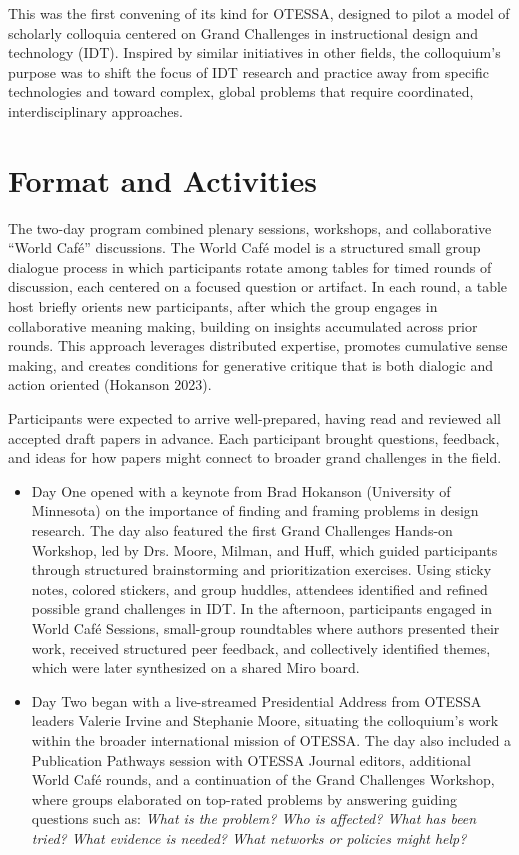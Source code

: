 \documentclass[
  letterpaper,
  DIV=11,
  numbers=noendperiod]{scrartcl}
\begin{document}
This was the first convening of its kind for OTESSA, designed to pilot a
model of scholarly colloquia centered on Grand Challenges in
instructional design and technology (IDT). Inspired by similar
initiatives in other fields, the colloquium's purpose was to shift the
focus of IDT research and practice away from specific technologies and
toward complex, global problems that require coordinated,
interdisciplinary approaches.

\section{Format and Activities}\label{format-and-activities}

The two-day program combined plenary sessions, workshops, and
collaborative ``World Café'' discussions. The World Café model is a
structured small group dialogue process in which participants rotate
among tables for timed rounds of discussion, each centered on a focused
question or artifact. In each round, a table host briefly orients new
participants, after which the group engages in collaborative meaning
making, building on insights accumulated across prior rounds. This
approach leverages distributed expertise, promotes cumulative sense
making, and creates conditions for generative critique that is both
dialogic and action oriented (Hokanson 2023).

Participants were expected to arrive well-prepared, having read and
reviewed all accepted draft papers in advance. Each participant brought
questions, feedback, and ideas for how papers might connect to broader
grand challenges in the field.

\begin{itemize}
\item
  Day One opened with a keynote from Brad Hokanson (University of
  Minnesota) on the importance of finding and framing problems in design
  research. The day also featured the first Grand Challenges Hands-on
  Workshop, led by Drs. Moore, Milman, and Huff, which guided
  participants through structured brainstorming and prioritization
  exercises. Using sticky notes, colored stickers, and group huddles,
  attendees identified and refined possible grand challenges in IDT. In
  the afternoon, participants engaged in World Café Sessions,
  small-group roundtables where authors presented their work, received
  structured peer feedback, and collectively identified themes, which
  were later synthesized on a shared Miro board.
\item
  Day Two began with a live-streamed Presidential Address from OTESSA
  leaders Valerie Irvine and Stephanie Moore, situating the colloquium's
  work within the broader international mission of OTESSA. The day also
  included a Publication Pathways session with OTESSA Journal editors,
  additional World Café rounds, and a continuation of the Grand
  Challenges Workshop, where groups elaborated on top-rated problems by
  answering guiding questions such as: \emph{What is the problem? Who is
  affected? What has been tried? What evidence is needed? What networks
  or policies might help?}
\end{itemize}
\end{document}
